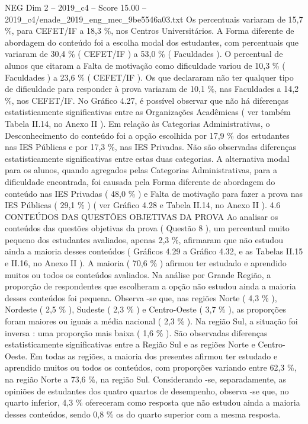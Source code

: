 \begin{textsample}{NEG Dim 2 – 2019\_c4 – Score 15.00 – 2019\_c4/enade\_2019\_eng\_mec\_9be5546a03.txt}
Os percentuais variaram de 15,7 \%, para CEFET/IF a 18,3 \%, nos Centros Universitários.
A Forma diferente de abordagem do conteúdo foi a escolha modal dos estudantes, com percentuais que variaram de 30,4 \% ( CEFET/IF ) a 53,0 \% ( Faculdades ).
O percentual de alunos que citaram a Falta de motivação como dificuldade variou de 10,3 \% ( Faculdades ) a 23,6 \% ( CEFET/IF ).
Os que declararam não ter qualquer tipo de dificuldade para responder à prova variaram de 10,1 \%, nas Faculdades a 14,2 \%, nos CEFET/IF.
No Gráfico 4.27, é possível observar que não há diferenças estatisticamente significativas entre as Organizações Acadêmicas ( ver também Tabela II.14, no Anexo II ).
Em relação às Categorias Administrativas, o Desconhecimento do conteúdo foi a opção escolhida por 17,9 \% dos estudantes nas IES Públicas e por 17,3 \%, nas IES Privadas.
Não são observadas diferenças estatisticamente significativas entre estas duas categorias.
A alternativa modal para os alunos, quando agregados pelas Categorias Administrativas, para a dificuldade encontrada, foi causada pela Forma diferente de abordagem do conteúdo nas IES Privadas ( 48,0 \% ) e Falta de motivação para fazer a prova nas IES Públicas ( 29,1 \% ) ( ver Gráfico 4.28 e Tabela II.14, no Anexo II ). 4.6 CONTEÚDOS DAS QUESTÕES OBJETIVAS DA PROVA Ao analisar os conteúdos das questões objetivas da prova ( Questão 8 ), um percentual muito pequeno dos estudantes avaliados, apenas 2,3 \%, afirmaram que não estudou ainda a maioria desses conteúdos ( Gráficos 4.29 a Gráfico 4.32, e as Tabelas II.15 e II.16, no Anexo II ).
A maioria ( 70,6 \% ) afirmou ter estudado e aprendido muitos ou todos os conteúdos avaliados.
Na análise por Grande Região, a proporção de respondentes que escolheram a opção não estudou ainda a maioria desses conteúdos foi pequena.
Observa -se que, nas regiões Norte ( 4,3 \% ), Nordeste ( 2,5 \% ), Sudeste ( 2,3 \% ) e Centro-Oeste ( 3,7 \% ), as proporções foram maiores ou iguais a média nacional ( 2,3 \% ).
Na região Sul, a situação foi inversa : uma proporção mais baixa ( 1,6 \% ).
São observadas diferenças estatisticamente significativas entre a Região Sul e as regiões Norte e Centro-Oeste.
Em todas as regiões, a maioria dos presentes afirmou ter estudado e aprendido muitos ou todos os conteúdos, com proporções variando entre 62,3 \%, na região Norte a 73,6 \%, na região Sul.
Considerando -se, separadamente, as opiniões de estudantes dos quatro quartos de desempenho, observa -se que, no quarto inferior, 4,3 \% ofereceram como resposta que não estudou ainda a maioria desses conteúdos, sendo 0,8 \% os do quarto superior com a mesma resposta.

\end{textsample}
